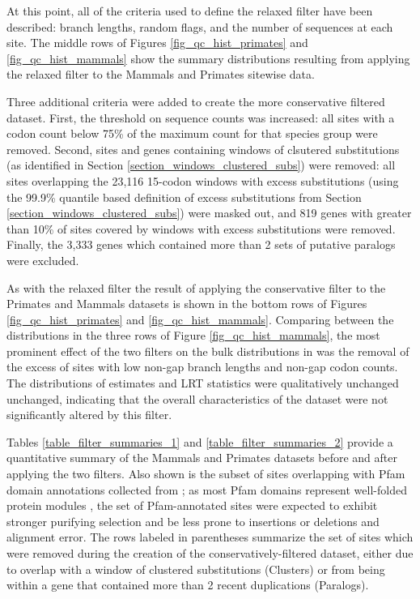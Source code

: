At this point, all of the criteria used to define the relaxed filter
have been described: \ngap branch lengths, random flags, and the
number of \ngap sequences at each site.
The middle rows of Figures \ref{fig_qc_hist_primates} and
\ref{fig_qc_hist_mammals} show the summary distributions resulting
from applying the relaxed filter to the Mammals and Primates sitewise
data.

Three additional criteria were added to create the more conservative
filtered dataset. First, the threshold on \ngap sequence counts was
increased: all sites with a \ngap codon count below 75\% of the
maximum \ngap count for that species group were removed. Second, sites
and genes containing windows of clsutered \nsyn substitutions (as
identified in Section \ref{section_windows_clustered_subs}) were
removed: all sites overlapping the 23,116 15-codon windows with excess
\nsyn substitutions (using the 99.9\% quantile based definition of
excess substitutions from Section
\ref{section_windows_clustered_subs}) were masked out, and 819 genes
with greater than 10\% of sites covered by windows with excess \nsyn
substitutions were removed. Finally, the 3,333 genes which contained
more than 2 sets of putative paralogs were excluded.

As with the relaxed filter
the result of
applying the conservative filter to the Primates and Mammals datasets is shown in
the bottom rows of Figures \ref{fig_qc_hist_primates} and
\ref{fig_qc_hist_mammals}. Comparing between the distributions in the three rows of Figure
\ref{fig_qc_hist_mammals}, the most prominent effect of the two
filters on the bulk distributions in was the removal of the excess of
sites with low non-gap branch lengths and non-gap codon counts. The
distributions of \omgml estimates and LRT statistics were
qualitatively unchanged unchanged, indicating that the overall
characteristics of the dataset were not significantly altered by this
filter.

Tables \ref{table_filter_summaries_1} and
\ref{table_filter_summaries_2} provide a quantitative summary of the
Mammals and Primates datasets before and after applying the two
filters. Also shown is the subset of sites overlapping with Pfam
domain annotations collected from \ens; as most Pfam domains represent
well-folded protein modules \citep{Finn2010}, the set of
Pfam-annotated sites were expected to exhibit stronger purifying
selection and be less prone to insertions or deletions and alignment
error. The rows labeled in parentheses summarize the set of sites
which were removed during the creation of the conservatively-filtered
dataset, either due to overlap with a window of clustered
substitutions (Clusters) or from being within a gene that contained
more than 2 recent duplications (Paralogs).

